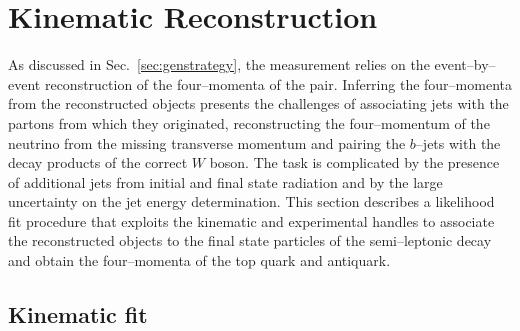 \chapter{Kinematic Reconstruction}
\label{sec:reconstruction}

As discussed in Sec.~\ref{sec:genstrategy}, the \ac{} measurement relies on
the event--by--event reconstruction of the four--momenta of the
\ttbar{} pair. Inferring the four--momenta from the
reconstructed objects presents the challenges of associating jets with
the partons from which they originated, reconstructing the
four--momentum of the neutrino from the missing transverse momentum
and pairing the $b$--jets with the decay products of the correct $W$
boson. The task is complicated by the presence of additional jets from
initial and final state radiation and by the large uncertainty on the
jet energy determination. 
This section describes a likelihood fit procedure that exploits the
kinematic and experimental handles to associate the reconstructed
objects to the final state particles of the semi--leptonic \ttbar{}
decay and obtain the four--momenta of the top quark and antiquark.

\section{Kinematic fit}

